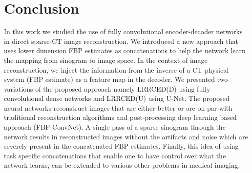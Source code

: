 \section{Conclusion} \label{sec:conclusion}

In this work we studied the use of fully convolutional encoder-decoder networks in direct sparse-\ac{CT} image reconstruction. We introduced a new approach that uses lower dimension \ac{FBP} estimates as concatenations to help the network learn the mapping from sinogram to image space. In the context of image reconstruction, we inject the information from the inverse of a \ac{CT} physical system (\ac{FBP} estimate) as a feature map in the decoder. We presented two variations of the proposed approach namely \ac{LRRCED}(D) using fully convolutional dense networks and \ac{LRRCED}(U) using U-Net. The proposed neural networks reconstruct images that are either better or are on par with traditional reconstruction algorithms and post-processing deep learning based approach (FBP-ConvNet). A single pass of a sparse sinogram through the network results in reconstructed images without the artifacts and noise which are severely present in the concatenated \ac{FBP} estimates. Finally, this idea of using task specific concatenations that enable one to have control over what the network learns, can be extended to various other problems in medical imaging. 


